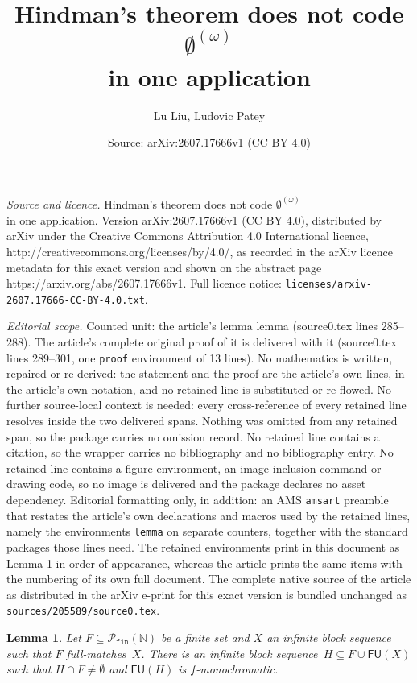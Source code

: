 \documentclass[10pt,a4paper]{amsart}
\title{Hindman's theorem does not code $\emptyset^{(\omega)}$\\ in one application}
\author{Lu Liu, Ludovic Patey}
\date{Source: arXiv:2607.17666v1 (CC BY 4.0)}
\newtheorem{lemma}{Lemma}
\newcommand{\FU}[0]{\mathsf{FU}} %
\newcommand{\NN}[0]{\mathbb{N}}
\newcommand{\Pfin}{\mathcal{P}_{\mathtt{fin}}}
\begin{document}
\maketitle

\noindent\emph{Source and licence.} Hindman's theorem does not code $\emptyset^{(\omega)}$\\ in one application. Version arXiv:2607.17666v1 (CC BY 4.0), distributed by arXiv under the Creative Commons Attribution 4.0 International licence, http://creativecommons.org/licenses/by/4.0/, as recorded in the arXiv licence metadata for this exact version and shown on the abstract page https://arxiv.org/abs/2607.17666v1. Full licence notice: \texttt{licenses/arxiv-2607.17666-CC-BY-4.0.txt}.\par\smallskip

\noindent\textit{Editorial scope.} Counted unit: the article's lemma lemma (source0.tex lines 285--288). The article's complete original proof of it is delivered with it (source0.tex lines 289--301, one \texttt{proof} environment of 13 lines). No mathematics is written, repaired or re-derived: the statement and the proof are the article's own lines, in the article's own notation, and no retained line is substituted or re-flowed.  No further source-local context is needed: every cross-reference of every retained line resolves inside the two delivered spans.  Nothing was omitted from any retained span, so the package carries no omission record.  No retained line contains a citation, so the wrapper carries no bibliography and no bibliography entry.  No retained line contains a figure environment, an image-inclusion command or drawing code, so no image is delivered and the package declares no asset dependency.  Editorial formatting only, in addition: an AMS \texttt{amsart} preamble that restates the article's own declarations and macros used by the retained lines, namely the environments \texttt{lemma} on separate counters, together with the standard packages those lines need.  The retained environments print in this document as Lemma 1 in order of appearance, whereas the article prints the same items with the numbering of its own full document.  The complete native source of the article as distributed in the arXiv e-print for this exact version is bundled unchanged as \texttt{sources/205589/source0.tex}.
\begin{lemma}
Let $F \subseteq \Pfin(\NN)$ be a finite set and $X$ an infinite block sequence such that $F$ full-matches~$X$.
There is an infinite block sequence~$H \subseteq F \cup \FU(X)$ such that $H \cap F \neq \emptyset$ and $\FU(H)$ is $f$-monochromatic. 
\end{lemma}
\end{document}
